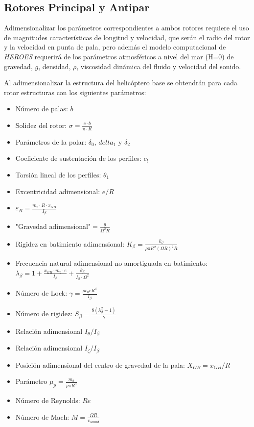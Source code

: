 \subsection{Rotores Principal y Antipar}

Adimensionalizar los parámetros correspondientes a ambos rotores requiere el uso de magnitudes características de longitud y velocidad, que serán el radio del rotor y la velocidad en punta de pala, pero además el modelo computacional de \emph{HEROES} requerirá de los parámetros atmosféricos a nivel del mar (H=0) de gravedad, $g$, densidad, $\rho$, viscosidad dinámica del fluido y velocidad del sonido.

Al adimensionalizar la estructura del helicóptero base se obtendrán para cada rotor estructuras con los siguientes parámetros:

\begin{multicols}{2}
	\begin{itemize}
		\item Número de palas: $b$
		\item Solidez del rotor: $\sigma=\frac{c\cdot b}{\pi\cdot R}$
		\item Parámetros de la polar: $\delta_0$, $delta_1$ y $\delta_2$
		\item Coeficiente de sustentación de los perfiles: $c_l$
		\item Torsión lineal de los perfiles: $\theta_1$
		\item Excentricidad adimensional: $e/R$
		\item $\varepsilon_R=\frac{m_b\cdot R\cdot x_{GB}}{I_\beta}$
		\item "Gravedad adimensional"$=\frac{g}{\Omega^2R}$
		\item Rigidez en batimiento adimensional: $K_\beta=\frac{k_\beta}{\rho \pi R^2(\Omega R)^2R}$
		\item Frecuencia natural adimensional no amortiguada en batimiento: $\lambda_\beta=1+\frac{x_{GB}\cdot m_b\cdot e}{I_\beta}+\frac{k_\beta}{I_\beta\cdot\Omega^2}$
		\item Número de Lock: $\gamma=\frac{\rho c_0cR^4}{I_\beta}$
		\item Número de rigidez: $S_\beta=\frac{8(\lambda_\beta^2-1)}{\gamma}$
		\item Relación adimensional $I_\theta/I_\beta$
		\item Relación adimensional $I_\zeta/I_\beta$
		\item Posición adimensional del centro de gravedad de la pala: $X_{GB}=x_{GB}/R$
		\item Parámetro $\mu_p=\frac{m_b}{\rho\pi R^3}$
		\item Número de Reynolds: $Re$
		\item Número de Mach: $M=\frac{\Omega R}{v_{sound}}$
		\end{itemize}
\end{multicols}
